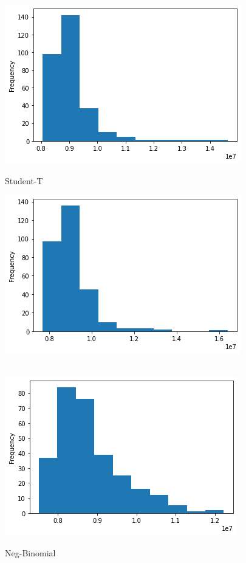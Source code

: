 \begin{figure}[htb]
  \centering
  \includegraphics[width=\linewidth]{./img/histogram_deepar_electricity_statistics_300_samples.png}
  \caption{Student-T}
  \label{deepar_student_t_distibution}
  \endminipage\hfill
  \includegraphics[width=\linewidth]{./img/histogram_deepar_negbin_electricity_statistics_200_samples.png}
  \caption{Neg-Binomial}
  \label{deepar_negbinomial_distibution}
  \endminipage\hfill
  \\
  \includegraphics[width=\linewidth]{./img/histogram_deepar_poisson_electricity_statistics_200_samples.png}

\end{figure}
